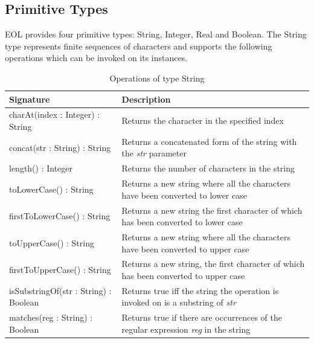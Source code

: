 \subsection{Primitive Types} 

EOL provides four primitive types: String, Integer, Real and Boolean. The String type represents finite sequences of characters and supports the following operations which can be invoked on its instances.

\begin{longtabu} {|p{6.5cm}|X|}
			
			\caption{Operations of type String}
			\label{tab:StringOperations}\\
			
			\hline 
							
			\textbf{Signature} & \textbf{Description} \\\hline
			
			charAt(index : Integer) : String & Returns the character in the specified index\\\hline
			
			concat(str : String) : String & Returns a concatenated form of the string with the \emph{str} parameter\\\hline

			length() : Integer & Returns the number of characters in the string \\\hline
						
			toLowerCase() : String & Returns a new string where all the characters have been converted to lower case\\\hline
			
			firstToLowerCase() : String & Returns a new string the first character of which has been converted to lower case \\\hline
			
			toUpperCase() : String & Returns a new string where all the characters have been converted to upper case\\\hline
			
			firstToUpperCase() : String & Returns a new string, the first character of which has been converted to upper case \\\hline
			
			isSubstringOf(str : String) : Boolean & Returns true iff the string the operation is invoked on is a substring of \emph{str} \\\hline
			
			matches(reg : String) : Boolean & Returns true if there are occurrences of the regular expression \emph{reg} in the string\\\hline
			

\end{longtabu}
